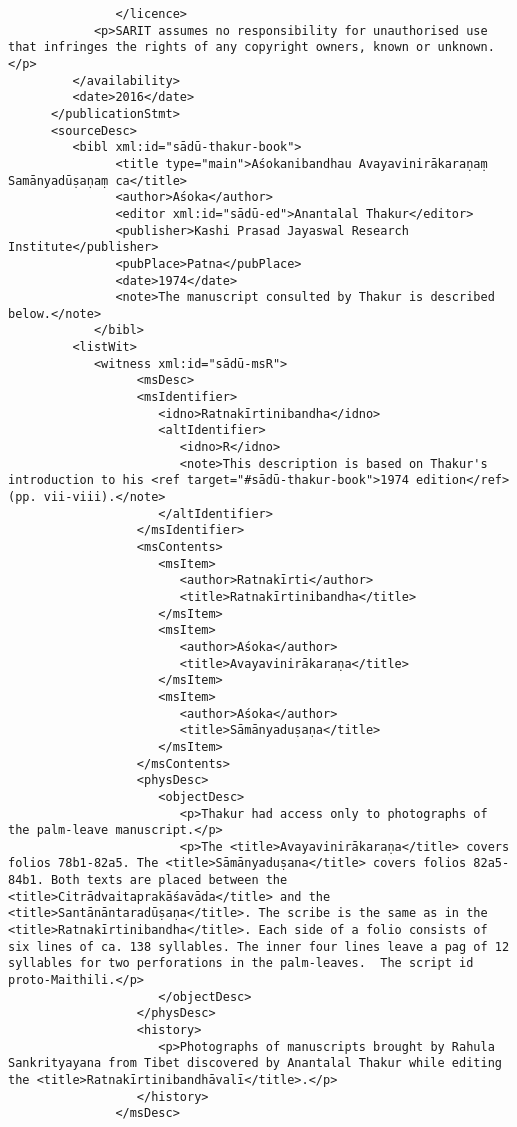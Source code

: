 \documentclass[article,12pt,a4paper]{memoir}%
\begin{document}
\begin{verbatim}
	           </licence>
            <p>SARIT assumes no responsibility for unauthorised use that infringes the rights of any copyright owners, known or unknown.</p>
         </availability>
         <date>2016</date>
      </publicationStmt>
      <sourceDesc>
         <bibl xml:id="sādū-thakur-book">
	           <title type="main">Aśokanibandhau Avayavinirākaraṇaṃ Samānyadūṣaṇaṃ ca</title>
	           <author>Aśoka</author>
	           <editor xml:id="sādū-ed">Anantalal Thakur</editor>
	           <publisher>Kashi Prasad Jayaswal Research Institute</publisher>
	           <pubPlace>Patna</pubPlace>
	           <date>1974</date>
	           <note>The manuscript consulted by Thakur is described below.</note>
	        </bibl>
         <listWit>
            <witness xml:id="sādū-msR">
	              <msDesc>
                  <msIdentifier>
                     <idno>Ratnakīrtinibandha</idno>
                     <altIdentifier>
                        <idno>R</idno>
                        <note>This description is based on Thakur's introduction to his <ref target="#sādū-thakur-book">1974 edition</ref> (pp. vii-viii).</note>
                     </altIdentifier>
                  </msIdentifier>
                  <msContents>
                     <msItem>
                        <author>Ratnakīrti</author>
                        <title>Ratnakīrtinibandha</title>
                     </msItem>
                     <msItem>
                        <author>Aśoka</author>
                        <title>Avayavinirākaraṇa</title>
                     </msItem>
                     <msItem>
                        <author>Aśoka</author>
                        <title>Sāmānyaduṣaṇa</title>
                     </msItem>
                  </msContents>
                  <physDesc>
                     <objectDesc>
                        <p>Thakur had access only to photographs of the palm-leave manuscript.</p>
                        <p>The <title>Avayavinirākaraṇa</title> covers folios 78b1-82a5. The <title>Sāmānyaduṣana</title> covers folios 82a5-84b1. Both texts are placed between the <title>Citrādvaitaprakāśavāda</title> and the <title>Santānāntaradūṣaṇa</title>. The scribe is the same as in the <title>Ratnakīrtinibandha</title>. Each side of a folio consists of six lines of ca. 138 syllables. The inner four lines leave a pag of 12 syllables for two perforations in the palm-leaves.  The script id proto-Maithili.</p>
                     </objectDesc>
                  </physDesc>
                  <history>
                     <p>Photographs of manuscripts brought by Rahula Sankrityayana from Tibet discovered by Anantalal Thakur while editing the <title>Ratnakīrtinibandhāvalī</title>.</p>
                  </history>
               </msDesc>


\end{verbatim}
\end{document}
